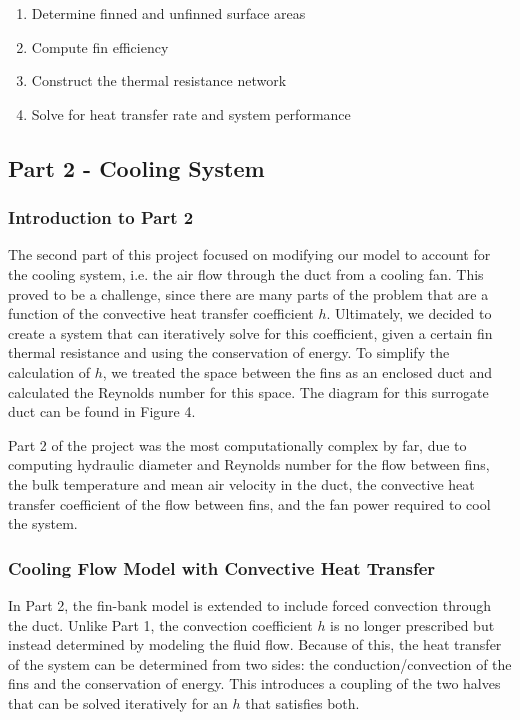 \documentclass[12pt, titlepage]{article}
\begin{document}
\begin{enumerate}
    \item Determine finned and unfinned surface areas
    \item Compute fin efficiency
    \item Construct the thermal resistance network
    \item Solve for heat transfer rate and system performance
\end{enumerate}

\subsection{Part 2 - Cooling System}
\subsubsection{Introduction to Part 2}

The second part of this project focused on modifying our model to account for the cooling system, i.e. the air flow through the duct from a cooling fan. This proved to be a challenge, since there are many parts of the problem that are a function of the convective heat transfer coefficient $h$. Ultimately, we decided to create a system that can iteratively solve for this coefficient, given a certain fin thermal resistance and using the conservation of energy. To simplify the calculation of $h$, we treated the space between the fins as an enclosed duct and calculated the Reynolds number for this space. The diagram for this surrogate duct can be found in Figure 4.

Part 2 of the project was the most computationally complex by far, due to computing hydraulic diameter and Reynolds number for the flow between fins, the bulk temperature and mean air velocity in the duct, the convective heat transfer coefficient of the flow between fins, and the fan power required to cool the system.

\subsubsection{Cooling Flow Model with Convective Heat Transfer}

In Part 2, the fin-bank model is extended to include forced convection through the duct. Unlike Part 1, the convection coefficient $h$ is no longer prescribed but instead determined by modeling the fluid flow. Because of this, the heat transfer of the system can be determined from two sides: the conduction/convection of the fins and the conservation of energy. This introduces a coupling of the two halves that can be solved iteratively for an $h$ that satisfies both.
\end{document}
